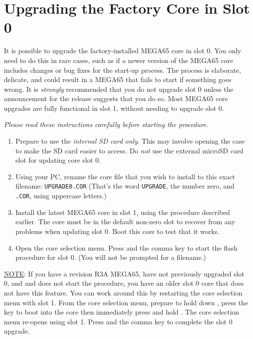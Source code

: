 \section{Upgrading the Factory Core in Slot 0}

It is possible to upgrade the factory-installed MEGA65 core in slot 0. You only need to do this in rare cases, such as if a newer version of the MEGA65 core includes changes or bug fixes for the start-up process. The process is elaborate, delicate, and could result in a MEGA65 that fails to start if something goes wrong. It is {\em strongly} recommended that you do not upgrade slot 0 unless the announcement for the release suggests that you do so. Most MEGA65 core upgrades are fully functional in slot 1, without needing to upgrade slot 0.

{\em Please read these instructions carefully before starting the procedure.}

\begin{enumerate}
  \item Prepare to use the {\em internal SD card only}. This may involve opening the case to make the SD card easier to access. Do {\em not} use the external microSD card slot for updating core slot 0.
  \item Using your PC, rename the core file that you wish to install to this exact filename: {\tt UPGRADE0.COR} (That's the word {\tt UPGRADE}, the number zero, and {\tt .COR}, using uppercase letters.)
  \item Install the latest MEGA65 core in slot 1, using the procedure described earlier. The core must be in the default non-zero slot to recover from any problems when updating slot 0. Boot this core to test that it works.
  \item Open the core selection menu. Press \megasymbolkey and the comma key to start the flash procedure for slot 0. (You will not be prompted for a filename.)
\end{enumerate}

\ifdefined\printmanual
\else
\underline{NOTE}: If you have a revision R3A MEGA65, have not previously upgraded slot 0, and \megasymbolkey and \megakey{,} does not start the procedure, you have an older slot 0 core that does not have this feature. You can work around this by restarting the core selection menu with slot 1. From the core selection menu, prepare to hold down , press the  key to boot into the core then immediately press and hold . The core selection menu re-opens using slot 1. Press \megasymbolkey and the comma key to complete the slot 0 upgrade.
\fi

